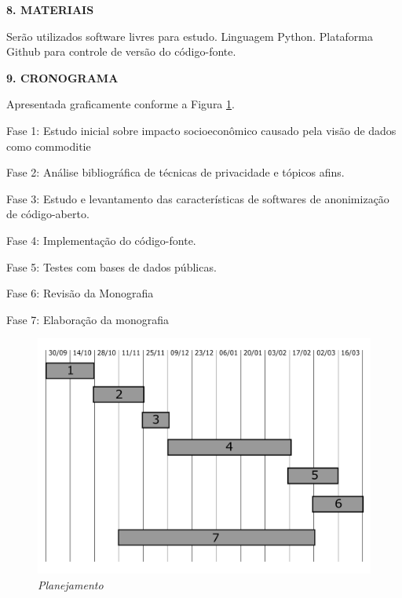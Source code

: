 \documentclass[a4paper,12pt,oneside,openany]{report}
\begin{document}
\vspace{0.4cm}
\textbf{8. MATERIAIS}
	
Serão utilizados software livres para estudo. Linguagem Python. Plataforma Github para controle de versão do código-fonte.

\vspace{0.4cm}
\textbf{9. CRONOGRAMA}

Apresentada graficamente conforme a Figura \ref{Fig:Cronograma}.

Fase 1: Estudo inicial sobre impacto socioeconômico causado pela visão de dados como commoditie

Fase 2: Análise bibliográfica de técnicas de privacidade e tópicos afins.

Fase 3: Estudo e levantamento das características de softwares de anonimização de código-aberto.

Fase 4: Implementação do código-fonte.

Fase 5: Testes com bases de dados públicas.

Fase 6: Revisão da Monografia

Fase 7: Elaboração da monografia


\begin{figure}
\begin{center}
\parbox[h]{14cm}
  {
  \begin{center}
  \includegraphics[scale=0.45]{Figuras/gantt.pdf}
  \caption[\small{\textit{Planejamento}}]{\label{Fig:Cronograma} \footnotesize{\textit{Planejamento}}}
  \end{center}
  }
\end{center}
\end{figure} 
\end{document}
